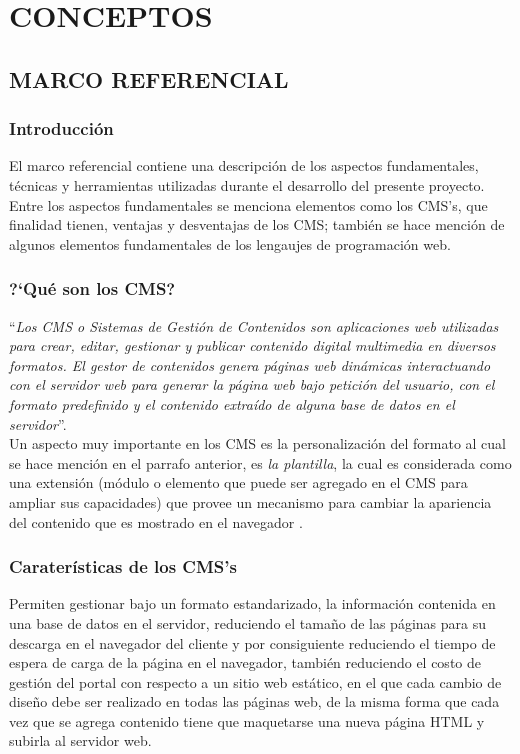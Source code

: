 \part{CONCEPTOS}

\chapter{MARCO REFERENCIAL}
\newpage

\section{Introducci\'on}
El marco referencial contiene una descripci\'on de los aspectos fundamentales, t\'ecnicas y herramientas utilizadas durante el desarrollo del presente proyecto.\\

Entre los aspectos fundamentales se menciona elementos como los CMS's, que finalidad tienen, ventajas y desventajas de los CMS; tambi\'en se hace menci\'on de algunos elementos fundamentales de los lengaujes de programaci\'on web.\\

\section{?`Qu\'e son los CMS?}
``\textit{Los CMS o Sistemas de Gesti\'on de Contenidos son aplicaciones web utilizadas para crear, editar, gestionar y publicar contenido digital multimedia en diversos formatos. El gestor de contenidos genera p\'aginas web din\'amicas interactuando con el servidor web para generar la p\'agina web bajo petici\'on del usuario, con el formato predefinido y el contenido extra\'ido de alguna base de datos en el servidor}''.\\

Un aspecto muy importante en los CMS es la personalizaci\'on del formato al cual se hace menci\'on en el parrafo anterior, es \textit{la plantilla}, la cual es considerada como una extensi\'on (m\'odulo o elemento que puede ser agregado en el CMS para ampliar sus capacidades) que provee un mecanismo para cambiar la apariencia del contenido que es mostrado en el navegador \cite{what_is_a_cms}.

\section{Carater\'isticas de los CMS's}
Permiten gestionar bajo un formato estandarizado, la informaci\'on contenida en una base de datos en el servidor, reduciendo el tama\~no de las p\'aginas para su descarga en el navegador del cliente y por consiguiente reduciendo el tiempo de espera de carga de la p\'agina en el navegador, tambi\'en reduciendo el costo de gesti\'on del portal con respecto a un sitio web est\'atico, en el que cada cambio de dise\~no debe ser realizado en todas las p\'aginas web, de la misma forma que cada vez que se agrega contenido tiene que maquetarse una nueva p\'agina HTML y subirla al servidor web.\\

